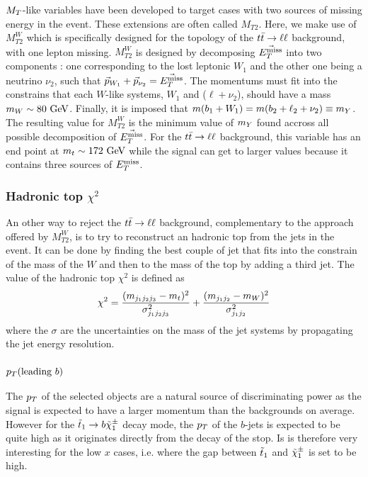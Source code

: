         $M_T$-like variables have been developed to target cases with two sources of missing energy
        in the event.  These extensions are often called $M_{T2}$. Here, we make use of
        $M_{T2}^W$ which is specifically designed for the topology of the $t\bar{t} \rightarrow \ell \ell$ background, with
        one lepton missing. $M_{T2}^W$ is designed by decomposing $\vec{E_T^\text{miss}}$ into two
        components : one corresponding to the lost leptonic $W_1$ and the other one being
        a neutrino $\nu_2$, such that $\vec{p}_{W_1} + \vec{p}_{\nu_2} = \vec{E_T^\text{miss}}$.
        The momentums must fit into the constrains that each $W$-like systems, $W_1$ and 
        ($\ell + \nu_2$), should have a mass $m_W \sim 80 ~\text{GeV}$. Finally, it is imposed that
        $m(b_1 + W_1) = m(b_2 + \ell_2 + \nu_2) \equiv m_{Y}$. 
        The resulting value for $M_{T2}^W$ is the minimum value of $m_{Y}$ found accross
        all possible decomposition of $\vec{E_T^\text{miss}}$. For the $t\bar{t} \rightarrow \ell \ell$ background, 
        this variable has an end point at $m_t \sim 172~\text{GeV}$ while the signal can get to 
        larger values because it contains three sources of $E_T^\text{miss}$.


        \subsubsection{Hadronic top $\chi^{2}$}
        
        An other way to reject the $t\bar{t} \rightarrow \ell \ell$ background, complementary to the approach
        offered by $M_{T2}^{W}$, is to try to reconstruct an hadronic top from the jets 
        in the event. It can be done by finding the best couple of jet that fits into
        the constrain of the mass of the $W$ and then to the mass of the top by adding a 
        third jet. The value of the hadronic top $\chi^2$ is defined as 
        $$\chi^2 = \frac{(m_{j_1 j_2 j_3} - m_{t})^2}{\sigma^2_{j_1 j_2 j_3}} + \frac{(m_{j_1 j_2} - m_{W})^2}{\sigma^2_{j_1 j_2}}$$
        where the $\sigma$ are the uncertainties on the mass of the jet systems by 
        propagating the jet energy resolution.

        \subsubsection{$p_T(\text{leading } b)$}

        The $p_T$ of the selected objects are a natural source of discriminating power as 
        the signal is expected to have a larger momentum than the backgrounds on average. 
        However for the $\tilde{t}_1 \rightarrow b \tilde{\chi}_1^\pm$ decay mode, the $p_T$ of the
        $b$-jets is expected to be quite high as it originates directly from the decay
        of the stop. Is is therefore very interesting for the low $x$ cases, i.e. where 
        the gap between $\tilde{t}_1$ and $\tilde{\chi}_1^\pm$ is set to be high.

